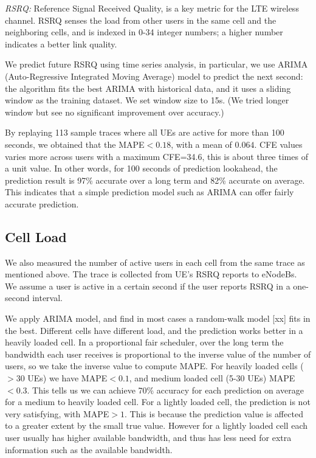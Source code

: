 \emph{RSRQ:} Reference Signal Received Quality, is a key metric for the LTE wireless channel. RSRQ senses the load from other users in the same cell and the neighboring cells, and is indexed in 0-34 integer numbers; a higher number indicates a better link quality. 

We predict future RSRQ using time series analysis, in particular, we use ARIMA (Auto-Regressive Integrated Moving Average) model to predict the next second: the algorithm fits the best ARIMA with historical data, and it uses a sliding window as the training dataset. We set window size to 15s. (We tried longer window but see no significant improvement over accuracy.) 

By replaying 113 sample traces where all UEs are active for more than 100 seconds, we obtained that the MAPE$<0.18$, with a mean of $0.064$. CFE values varies more across users with a maximum CFE=34.6, this is about three times of a unit value. In other words, for 100 seconds of prediction lookahead, the prediction result is 97\% accurate over a long term and 82\% accurate on average. This indicates that a simple prediction model such as ARIMA can offer fairly accurate prediction. 

\subsection{Cell Load}\label{subsec:NUser}
We also measured the number of active users in each cell from the same trace as mentioned above. The trace is collected from UE's RSRQ reports to eNodeBs. We assume a user is active in a certain second if the user reports RSRQ in a one-second interval. 

We apply ARIMA model, and find in most cases a random-walk model [xx] fits in the best. Different cells have different load, and the prediction works better in a heavily loaded cell. 
In a proportional fair scheduler, over the long term the bandwidth each user receives is proportional to the inverse value of the number of users, so we take the inverse value to compute MAPE. For heavily loaded cells ($>30$ UEs) we have MAPE$<0.1$, and medium loaded cell (5-30 UEs) MAPE$<0.3$. This tells us we can achieve 70\% accuracy for each prediction on average for a medium to heavily loaded cell. For a lightly loaded cell, the prediction is not very satisfying, with MAPE$>1$. This is because the prediction value is affected to a greater extent by the small true value. However for a lightly loaded cell each user usually has higher available bandwidth, and thus has less need for extra information such as the available bandwidth.  










